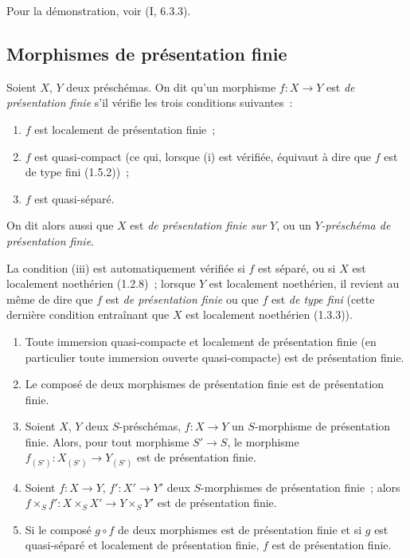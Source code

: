 Pour la démonstration, voir (I, 6.3.3).

\subsection{Morphismes de présentation finie}
\label{subsection:IV.1.6-fr}

\begin{definition}[1.6.1]
\label{IV.1.6.1-fr}
Soient $X$, $Y$ deux préschémas. On dit qu'un morphisme $f:X\to Y$ est
\emph{de présentation finie} s'il vérifie les trois conditions suivantes~:
\begin{enumerate}
  \item[(i)] $f$ est localement de présentation finie~;
  \item[(ii)] $f$ est quasi-compact (ce qui, lorsque (i) est vérifiée,
  équivaut à dire que $f$ est de type fini (1.5.2))~;
  \item[(iii)] $f$ est quasi-séparé.
\end{enumerate}
On dit alors aussi que $X$ est \emph{de présentation finie sur $Y$}, ou un
\emph{$Y$-préschéma de présentation finie}.
\end{definition}

La condition (iii) est automatiquement vérifiée si $f$ est séparé, ou si $X$
est localement noethérien (1.2.8)~; lorsque $Y$ est localement noethérien, il
revient au même de dire que $f$ est \emph{de présentation finie} ou que $f$
est \emph{de type fini} (cette dernière condition entraînant que $X$ est
localement noethérien (1.3.3)).


\begin{proposition}[1.6.2]
\label{IV.1.6.2-fr}
\begin{enumerate}
  \item[(i)] Toute immersion quasi-compacte et localement de présentation
  finie (en particulier toute immersion ouverte quasi-compacte) est de
  présentation finie.
  \item[(ii)] Le composé de deux morphismes de présentation finie est de
  présentation finie.
  \item[(iii)] Soient $X$, $Y$ deux $S$-préschémas, $f:X\to Y$ un
  $S$-morphisme de présentation finie. Alors, pour tout morphisme $S'\to S$,
  le morphisme $f_{(S')}:X_{(S')}\to Y_{(S')}$ est de présentation finie.
  \item[(iv)] Soient $f:X\to Y$, $f':X'\to Y'$ deux $S$-morphismes de
  présentation finie~; alors
  $f\times_Sf':X\times_SX'\to Y\times_SY'$ est de présentation finie.
  \item[(v)] Si le composé $g\circ f$ de deux morphismes est de présentation
  finie et si $g$ est quasi-séparé et localement de présentation finie, $f$
  est de présentation finie.
\end{enumerate}
\end{proposition}

